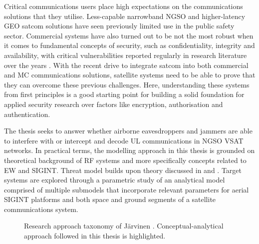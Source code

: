 \documentclass[english, 12pt, a4paper, elec, utf8, a-1b, online]{aaltothesis}
\begin{document}
Critical communications users place high expectations on the communications solutions that they utilise.
Less-capable narrowband NGSO and higher-latency GEO satcom solutions have seen previously limited use in the public safety sector. Commercial systems have also turned out to be not the most robust when it comes to fundamental concepts of security, such as confidentiality, integrity and availability, with critical vulnerabilities reported regularly in research literature over the years \cite{lin2022defending,pavur2020tale,santamarta2014wake,schia2023subsea}.
With the recent drive to integrate satcom into both commercial and MC communications solutions, satellite systems need to be able to prove that they can overcome these previous challenges.
Here, understanding these systems from first principles is a good starting point for building a solid foundation for applied security research over factors like encryption, authorisation and authentication.

The thesis seeks to answer whether airborne eavesdroppers and jammers are able to interfere with or intercept and decode UL communications in NGSO VSAT networks.
In practical terms, the modelling approach in this thesis is grounded on theoretical background of RF systems and more specifically concepts related to EW and SIGINT.
Threat model builds upon theory discussed in \cite{kosola2013digitaalinen} and \cite{wiley2006elint}.
Target systems are explored through a parametric study of an analytical model comprised of multiple submodels that incorporate relevant parameters for aerial SIGINT platforms and both space and ground segments of a satellite communications system.

\begin{figure}[h]
  \centering
  
  \caption{Research approach taxonomy of Järvinen \cite{jarvinen2011tutkimustyon, jarvinen2004research}. Conceptual-analytical approach followed in this thesis is highlighted.}
  \label{fig-research-taxonomy}
\end{figure}
\end{document}
